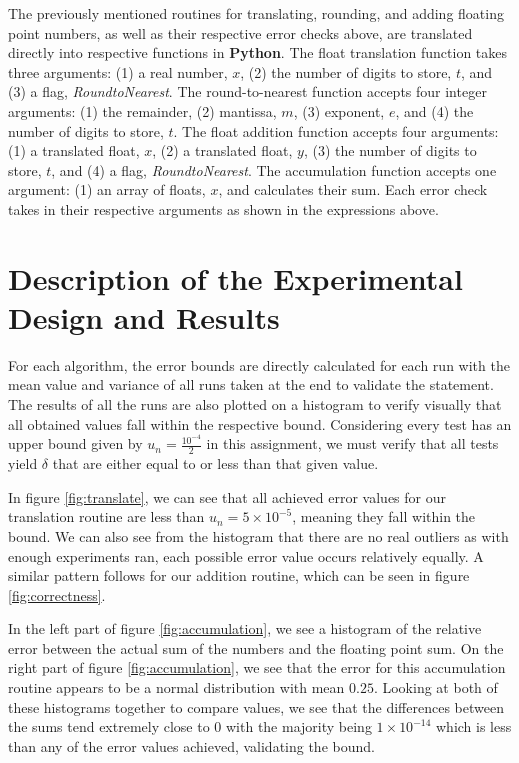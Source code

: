 \documentclass[11pt]{article}
\begin{document}
The previously mentioned routines for translating, rounding, and adding floating point numbers, as well as their respective error checks above, are translated directly into respective functions in \textbf{Python}. The float translation function takes three arguments: (1) a real number, $x$, (2) the number of digits to store, $t$, and (3) a flag, \emph{RoundtoNearest}. The round-to-nearest function accepts four integer arguments: (1) the remainder, (2) mantissa, $m$, (3) exponent, $e$, and (4) the number of digits to store, $t$. The float addition function accepts four arguments: (1) a translated float, $x$, (2) a translated float, $y$, (3) the number of digits to store, $t$, and (4) a flag, \emph{RoundtoNearest}. The accumulation function accepts one argument: (1) an array of floats, $x$, and calculates their sum. Each error check takes in their respective arguments as shown in the expressions above.

\section{Description of the Experimental Design and Results}

For each algorithm, the error bounds are directly calculated for each run with the mean value and variance of all runs taken at the end to validate the statement. The results of all the runs are also plotted on a histogram to verify visually that all obtained values fall within the respective bound. Considering every test has an upper bound given by $u_n = \frac{10^{-4}}{2}$ in this assignment, we must verify that all tests yield $\delta$ that are either equal to or less than that given value.  

In figure \ref{fig:translate}, we can see that all achieved error values for our translation routine are less than $u_n = 5 \times 10^{-5}$, meaning they fall within the bound. We can also see from the histogram that there are no real outliers as with enough experiments ran, each possible error value occurs relatively equally. A similar pattern follows for our addition routine, which can be seen in figure \ref{fig:correctness}.

In the left part of figure \ref{fig:accumulation}, we see a histogram of the relative error between the actual sum of the numbers and the floating point sum. On the right part of figure \ref{fig:accumulation}, we see that the error for this accumulation routine appears to be a normal distribution with mean $0.25$. Looking at both of these histograms together to compare values, we see that the differences between the sums tend extremely close to 0 with the majority being $1 \times 10^{-14}$ which is less than any of the error values achieved, validating the bound.
\end{document}
